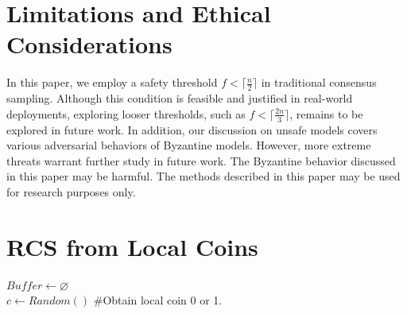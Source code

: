 \documentclass[11pt]{article}
\begin{document}
\section{Limitations and Ethical Considerations}
In this paper, we employ a safety threshold $f < \lceil \frac{n}{2} \rceil$ in traditional consensus sampling. Although this condition is feasible and justified in real-world deployments, exploring looser thresholds, such as $f < \lceil \frac{2n}{3} \rceil$, remains to be explored in future work. In addition, our discussion on unsafe models covers various adversarial behaviors of Byzantine models. However, more extreme threats warrant further study in future work. The Byzantine behavior discussed in this paper may be harmful. The methods described in this paper may be used for research purposes only.

%

\onecolumn
\newpage

\appendix


\section{RCS from Local Coins}
\label{app:Local Coin}

\begin{algorithm}[h]
\SetAlgoLined
{}

$Buffer \gets \varnothing$\\
$c \gets Random()$ \textcolor{mGreen}{\#Obtain local coin 0 or 1.} \\


\caption{Reliable Consensus Sampling from Local Coins}
\label{alg:coin}
\end{algorithm}
\end{document}
